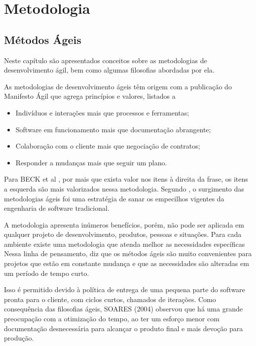 \chapter[Metodologia]{Metodologia}


\section{Métodos Ágeis}
\label{sec:Métodos Ágeis}

Neste capítulo são apresentados conceitos sobre as metodologias de
desenvolvimento ágil, bem como algumas filosofias abordadas por ela.

As metodologias de desenvolvimento ágeis têm origem com a publicação
do Manifesto Ágil \cite{manifestoAgil} que agrega princípios e valores, listados a

\begin{itemize}
  \item Indivíduos e interações mais que processos e ferramentas;
    \item Software em funcionamento mais que documentação abrangente;
    \item Colaboração com o cliente mais que negociação de contratos;
    \item Responder a mudanças mais que seguir um plano.
\end{itemize}

Para BECK et al \cite{manifestoAgil}, por mais que exista valor nos itens à direita da
frase, os itens a esquerda são mais valorizados nessa metodologia.
Segundo \cite{pressman}, o surgimento das metodologias ágeis foi uma
estratégia de sanar os empecilhos vigentes da engenharia de software tradicional.


A metodologia apresenta inúmeros benefícios, porém, não pode ser aplicada em
qualquer projeto de desenvolvimento, produtos, pessoas e situações. Para cada
ambiente existe uma metodologia que atenda melhor as necessidades específicas
Nessa linha de pensamento, \cite{pressman} diz que os métodos ágeis
são muito convenientes para projetos que estão em constante mudança e que as
necessidades são alteradas em um período de tempo curto.

Isso é permitido
devido à política de entrega de uma pequena parte do software pronta para o
cliente, com ciclos curtos, chamados de iterações.
Como consequência das filosofias ágeis, SOARES (2004) observou que
há uma grande preocupação com a otimização do tempo, ao ter um esforço
menor com documentação desnecessária para alcançar o produto final e mais
devoção para produção.

